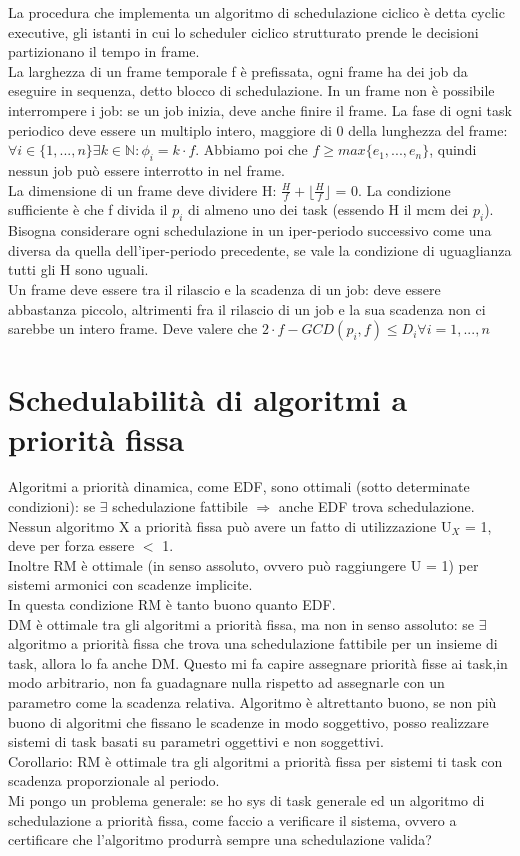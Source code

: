 \documentclass{article}
\begin{document}
La procedura che implementa un algoritmo di schedulazione ciclico è detta cyclic executive, gli istanti in cui lo scheduler ciclico strutturato prende le decisioni partizionano il tempo in frame.\\ La larghezza di un frame temporale f è prefissata, ogni frame ha dei job da eseguire in sequenza, detto blocco di schedulazione. In un frame non è possibile interrompere i job: se un job inizia, deve anche finire il frame. La fase di ogni task periodico deve essere un multiplo intero, maggiore di 0 della lunghezza del frame: $\forall i \in \{1,...,n\} \exists k \in \mathbb{N}: \phi_i = k\cdot f$. Abbiamo poi che $f \geq max\{e_1,...,e_n\}$, quindi nessun job può essere interrotto in nel frame.\\ La dimensione di un frame deve dividere H: $\frac{H}{f} + \lfloor \frac{H}{f} \rfloor$ = 0. La condizione sufficiente è che f divida il $p_i$ di almeno uno dei task (essendo H il mcm dei $p_i$). Bisogna considerare ogni schedulazione in un iper-periodo successivo come una diversa da quella dell'iper-periodo precedente, se vale la condizione di uguaglianza tutti gli H sono uguali.\\ Un frame deve essere tra il rilascio e la scadenza di un job: deve essere abbastanza piccolo, altrimenti fra il rilascio di un job e la sua scadenza non ci sarebbe un intero frame. Deve valere che $2\cdot f - GCD(p_i, f) \leq D_i \forall i = 1,...,n$
\section{Schedulabilità di algoritmi a priorità fissa}
Algoritmi a priorità dinamica, come EDF, sono ottimali (sotto determinate condizioni): se $\exists$ schedulazione fattibile $\Rightarrow$ anche EDF trova schedulazione.\\ Nessun algoritmo X a priorità fissa può avere un fatto di utilizzazione U$_{X}$ = 1, deve per forza essere $<$ 1.\\ Inoltre RM è ottimale (in senso assoluto, ovvero può raggiungere U = 1) per sistemi armonici con scadenze implicite.\\ In questa condizione RM è tanto buono quanto EDF.\\ DM è ottimale tra gli algoritmi a priorità fissa, ma non in senso assoluto: se $\exists$ algoritmo a priorità fissa che trova una schedulazione fattibile per un insieme di task, allora lo fa anche DM. Questo mi fa capire assegnare priorità fisse ai task,in modo arbitrario, non fa guadagnare nulla rispetto ad assegnarle con un parametro come la scadenza relativa. Algoritmo è altrettanto buono, se non più buono di algoritmi che fissano le scadenze in modo soggettivo, posso realizzare sistemi di task basati su parametri oggettivi e non soggettivi.\\ Corollario: RM è ottimale tra gli algoritmi a priorità fissa per sistemi ti task con scadenza proporzionale al periodo.\\ Mi pongo un problema generale: se ho sys di task generale ed un algoritmo di schedulazione a priorità fissa, come faccio a verificare il sistema, ovvero a certificare che l'algoritmo produrrà sempre una schedulazione valida?
\end{document}
